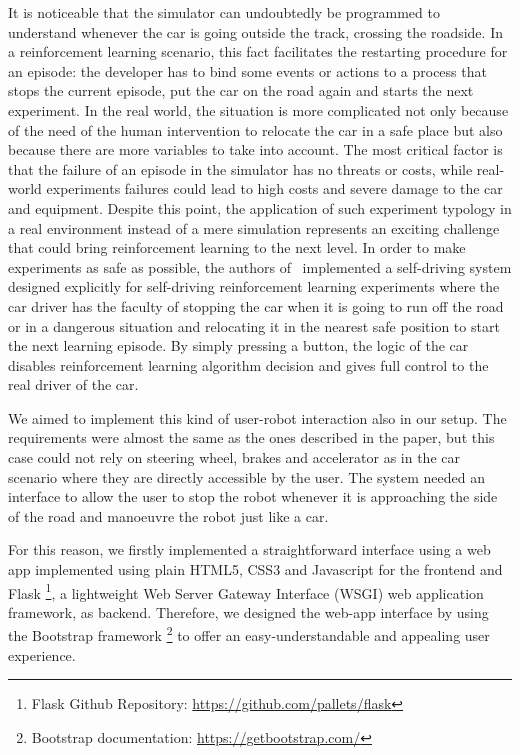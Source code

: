 It is noticeable that the simulator can undoubtedly be programmed to understand whenever the car is going outside the track, crossing the roadside.
In a reinforcement learning scenario, this fact facilitates the restarting procedure for an episode: the developer has to bind some events or actions to a process that stops the current episode, put the car on the road again and starts the next experiment.
In the real world, the situation is more complicated not only because of the need of the human intervention to relocate the car in a safe place but also because there are more variables to take into account.
The most critical factor is that the failure of an episode in the simulator has no threats or costs, while real-world experiments failures could lead to high costs and severe damage to the car and equipment.
Despite this point, the application of such experiment typology in a real environment instead of a mere simulation represents an exciting challenge that could bring reinforcement learning to the next level.
In order to make experiments as safe as possible, the authors of~\cite{kendall2018learning,kendall2019learning} implemented a self-driving system designed explicitly for self-driving reinforcement learning experiments where the car driver has the faculty of stopping the car when it is going to run off the road or in a dangerous situation and relocating it in the nearest safe position to start the next learning episode.
By simply pressing a button, the logic of the car disables reinforcement learning algorithm decision and gives full control to the real driver of the car.

We aimed to implement this kind of user-robot interaction also in our setup.
The requirements were almost the same as the ones described in the paper, but this case could not rely on steering wheel, brakes and accelerator as in the car scenario where they are directly accessible by the user.
The system needed an interface to allow the user to stop the robot whenever it is approaching the side of the road and manoeuvre the robot just like a car.

For this reason, we firstly implemented a straightforward interface using a web app implemented using plain HTML5, CSS3 and Javascript for the frontend and Flask \footnote{Flask Github Repository: \href{https://github.com/pallets/flask}{https://github.com/pallets/flask}}, a lightweight Web Server Gateway Interface (WSGI) web application framework, as backend.
Therefore, we designed the web-app interface by using the Bootstrap framework \footnote{Bootstrap documentation: \href{https://getbootstrap.com/}{https://getbootstrap.com/}} to offer an easy-understandable and appealing user experience.

